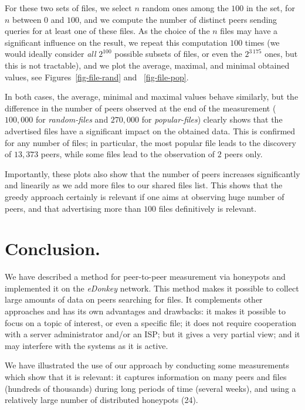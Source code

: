 \documentclass[final,
notitlepage,
narroweqnarray,
	inline,
	twoside,
]{ieee}
\begin{document}
For these two sets of files, we select $n$ random ones among the $100$ in the set, for $n$ between $0$ and $100$, and we compute the number of distinct peers sending queries for at least one of these files. As the choice of the $n$ files may have a significant influence on the result, we repeat this computation $100$ times (we would ideally consider {\em all} $2^{100}$ possible subsets of files, or even the $2^{3\,175}$ ones, but this is not tractable), and we plot the average, maximal, and minimal obtained values, see Figures~\ref{fig-file-rand} and ~\ref{fig-file-pop}.

In both cases, the average, minimal and maximal values behave
similarly, but the difference in the number of peers observed at the
end of the measurement ($100,000$ for {\em random-files} and $270,000$ for
{\em popular-files}) clearly shows that the advertised files have a
significant impact on the obtained data. This is confirmed for any
number of files; in particular, the most popular file leads to the
discovery of $13,373$ peers, while some files lead to the observation
of $2$ peers only.

Importantly, these plots also show that the number of peers increases significantly and linearily as we add more files to our shared files list. This shows that the greedy approach certainly is relevant if one aims at observing huge number of peers, and that advertising more than $100$ files definitively is relevant.

\section{Conclusion.}
\label{sec-conclu}

We have described a method for peer-to-peer measurement via honeypots and implemented it on the {\em eDonkey} network. This method makes it possible to collect large amounts of data on peers searching for files. It complements other approaches and has its own advantages and drawbacks: it makes it possible to focus on a topic of interest, or even a specific file; it does not require cooperation with a server administrator and/or an ISP; but it gives a very partial view; and it may interfere with the systems as it is active.

We have illustrated the use of our approach by conducting some measurements which show that it is relevant: it captures information on many peers and files (hundreds of thousands) during long periods of time (several weeks), and using a relatively large number of distributed honeypots (24).
\end{document}
